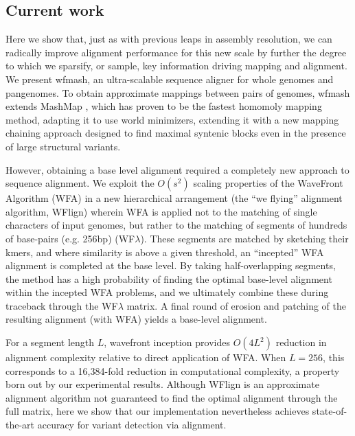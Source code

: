 \documentclass{bioinfo}
\theoremstyle{definition}
\begin{document}
\subsection{Current work}

Here we show that, just as with previous leaps in assembly resolution, we can radically improve alignment performance for this new scale by further the degree to which we sparsify, or sample, key information driving mapping and alignment.
We present wfmash, an ultra-scalable sequence aligner for whole genomes and pangenomes.
To obtain approximate mappings between pairs of genomes, wfmash extends MashMap \citep{Jain_2018}, which has proven to be the fastest homomoly mapping method, adapting it to use world minimizers, extending it with a new mapping chaining approach designed to find maximal syntenic blocks even in the presence of large structural variants.

However, obtaining a base level alignment required a completely new approach to sequence alignment.
We exploit the $O(s^2)$ scaling properties of the WaveFront Algorithm (WFA) \citep{Marco_Sola_2020} in a new hierarchical arrangement (the ``we flying'' alignment algorithm, WFlign) wherein WFA is applied not to the matching of single characters of input genomes, but rather to the matching of segments of hundreds of base-pairs (e.g. 256bp) (WF$\lambda$).
These segments are matched by sketching their kmers, and where similarity is above a given threshold, an ``incepted'' WFA alignment is completed at the base level.
By taking half-overlapping segments, the method has a high probability of finding the optimal base-level alignment within the incepted WFA problems, and we ultimately combine these during traceback through the WF$\lambda$ matrix.
A final round of erosion and patching of the resulting alignment (with WFA) yields a base-level alignment.

For a segment length $L$, wavefront inception provides $O(4L^2)$ reduction in alignment complexity relative to direct application of WFA.
When $L=256$, this corresponds to a 16,384-fold reduction in computational complexity, a property born out by our experimental results.
Although WFlign is an approximate alignment algorithm not guaranteed to find the optimal alignment through the full matrix, here we show that our implementation nevertheless achieves state-of-the-art accuracy for variant detection via alignment.
\end{document}
